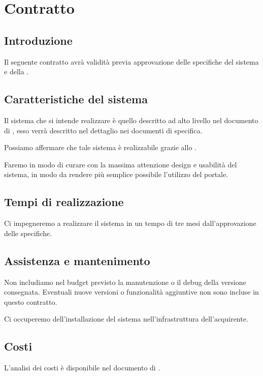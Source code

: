 \chapter{Contratto} 
\label{cha:contratto}

\section{Introduzione}
Il seguente contratto avrà validità previa approvazione delle specifiche del sistema e della .

\section{Caratteristiche del sistema} 
\label{sec:caratteristiche_del_sistema}
Il sistema che si intende realizzare è quello descritto ad alto livello nel documento di , esso verrà descritto nel dettaglio nei documenti di specifica. 

Possiamo affermare che tale sistema è realizzabile grazie allo .

Faremo in modo di curare con la massima attenzione design e usabilità del sistema, in modo da rendere più semplice possibile l'utilizzo del portale.


\section{Tempi di realizzazione} 
\label{sec:tempi_di_realizzazione}

Ci impegneremo a realizzare il sistema in un tempo di tre mesi dall'approvazione delle specifiche.

\section{Assistenza e mantenimento} 
\label{sec:assistenza_e_mantenimento}
Non includiamo nel budget previsto la manutenzione o il debug della versione consegnata. Eventuali nuove versioni o funzionalità aggiuntive non sono incluse in questo contratto. 

Ci occuperemo dell’installazione del sistema nell'infrastruttura dell'acquirente.

\section{Costi} 
\label{sec:costi}
L'analisi dei costi è disponibile nel documento di .

